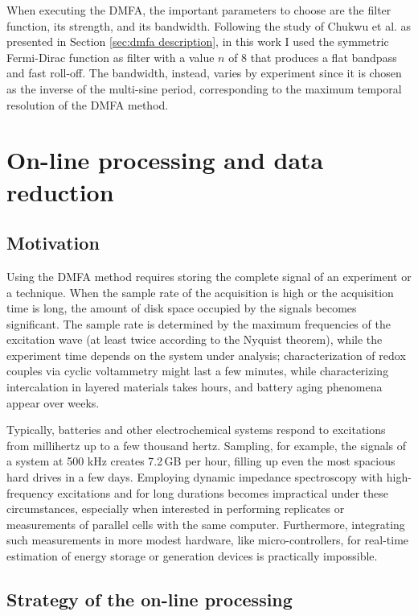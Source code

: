 When executing the DMFA, the important parameters to choose are the filter function, its strength, and its bandwidth.
Following the study of Chukwu et al.\cite{chukwuStatisticalAnalysisMeasurement2022} as presented in Section \ref{sec:dmfa description}, in this work I used the symmetric Fermi-Dirac function as filter with a value $n$ of 8 that produces a flat bandpass and fast roll-off.
The bandwidth, instead, varies by experiment since it is chosen as the inverse of the multi-sine period, corresponding to the maximum temporal resolution of the DMFA method.

\section{On-line processing and data reduction}
\label{On-line computation}

\subsection{Motivation}
Using the DMFA method requires storing the complete signal of an experiment or a technique.
When the sample rate of the acquisition is high or the acquisition time is long, the amount of disk space occupied by the signals becomes significant.
The sample rate is determined by the maximum frequencies of the excitation wave (at least twice according to the Nyquist theorem), while the experiment time depends on the system under analysis; characterization of redox couples via cyclic voltammetry might last a few minutes, while characterizing intercalation in layered materials takes hours, and battery aging phenomena appear over weeks.

Typically, batteries and other electrochemical systems respond to excitations from millihertz up to a few thousand hertz.
Sampling, for example, the signals of a system at 500 kHz creates 7.2\,GB per hour, filling up even the most spacious hard drives in a few days.
Employing dynamic impedance spectroscopy with high-frequency excitations and for long durations becomes impractical under these circumstances, especially when interested in performing replicates or measurements of parallel cells with the same computer.
Furthermore, integrating such measurements in more modest hardware, like micro-controllers, for real-time estimation of energy storage or generation devices is practically impossible.

\subsection{Strategy of the on-line processing}

